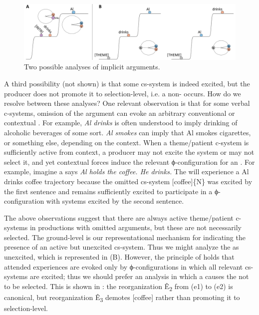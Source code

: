   
\begin{figure}
\includegraphics[width=\textwidth]{figures/Tilsen-img86.png}
\caption{Two possible analyses of implicit arguments.}
\label{fig:4:36}
\end{figure}
 

  A third possibility (not shown) is that some cs-system is indeed excited, but the producer does not promote it to selection-level, i.e. a non- occurs. How do we resolve between these analyses? One relevant observation is that for some verbal c-systems, omission of the argument can evoke an arbitrary conventional or contextual . For example, \textit{Al drinks} is often understood to imply drinking of alcoholic beverages of some sort. \textit{Al smokes} can imply that Al smokes cigarettes, or something else, depending on the context. When a theme/patient c-system is sufficiently active from context, a producer may not excite the system or may not select it, and yet contextual forces induce the relevant ϕ-configuration for an . For example, imagine a  says \textit{Al holds the coffee. He drinks.} The  will experience a {\textbar}Al drinks coffee{\textbar} trajectory because the omitted cs-system [coffee]\{N\} was excited by the first sentence and remains sufficiently excited to participate in a ϕ-configuration with systems excited by the second sentence.

  The above observations suggest that there are always active theme/patient c-systems in productions with omitted arguments, but these are not necessarily selected. The ground-level is our representational mechanism for indicating the presence of an active but unexcited cs-system. Thus we might analyze the  as unexcited, which is represented in {}(B). However, the principle of  holds that attended  experiences are evoked only by ϕ-configurations in which all relevant cs-systems are excited; thus we should prefer an analysis in which a  causes the  not to be selected. This is shown in {}: the reorganization Ê\textsubscript{2} from (e1) to (e2) is canonical, but reorganization Ê\textsubscript{3} demotes [coffee] rather than promoting it to selection-level.

